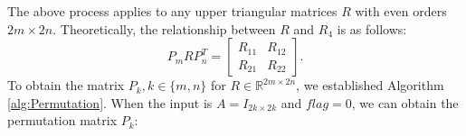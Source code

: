\documentclass[3p]{elsarticle}
\numberwithin{equation}{section}
\begin{document}

  The above process  applies to any upper triangular matrices $R$ with even orders $2m \times 2n$. Theoretically, the relationship between $R$ and $R_4$ is as follows:
\begin{equation}\label{eq:Rn}
    P_{m} R P_{n}^T = \begin{bmatrix} R_{11} & R_{12}\\R_{21}& R_{22}\end{bmatrix}.
\end{equation}
To obtain the matrix $P_k, k\in \{m,n\}$ for $R \in \mathbb{R}^{2m \times 2n}$, we established Algorithm \ref{alg:Permutation}. When the input is $A=I_{2k \times 2k}$ and $flag=0$, we can obtain the permutation matrix $P_k$:
\end{document}

